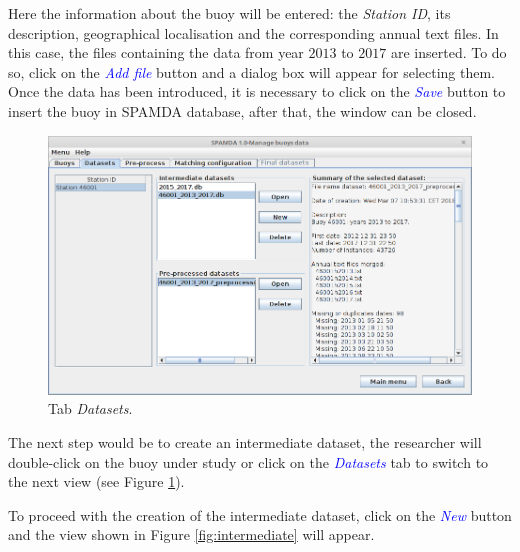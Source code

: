\begin{onehalfspace}
			Here the information about the buoy will be entered: the \textit{Station ID}, its description, geographical localisation and the corresponding annual text files. In this case, the files containing the data from year $2013$ to $2017$ are inserted. To do so, click on the \textcolor{blue}{\textit{Add file}} button and a dialog box will appear for selecting them. Once the data has been introduced, it is necessary to click on the \textcolor{blue}{\textit{Save}} button to insert the buoy in SPAMDA database, after that, the window can be closed.

			\begin{figure}[ht!]
				\centering
				\includegraphics[scale=0.47]{figures/tabDatasets_CS.png}
				\caption{Tab \textit{Datasets}.}\label{fig:show_datasets}
			\end{figure}
			
			
			The next step would be to create an intermediate dataset, the researcher will double-click on the buoy under study or click on the \textcolor{blue}{\textit{Datasets}} tab to switch to the next view (see Figure \ref{fig:show_datasets}).
			
			To proceed with the creation of the intermediate dataset, click on the \textcolor{blue}{\textit{New}} button and the view shown in Figure \ref{fig:intermediate} will appear. 
			

\end{onehalfspace}
